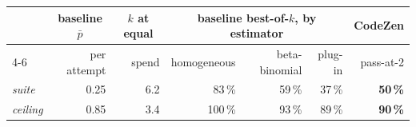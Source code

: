 
\begin{tabular}{@{}lrrrrrr@{}}
\toprule
 & \multicolumn{1}{c}{baseline $\bar p$} & \multicolumn{1}{c}{$k$ at equal} &
 \multicolumn{3}{c}{baseline best-of-$k$, by estimator} & \multicolumn{1}{c}{CodeZen} \\
\cmidrule(lr){4-6}
 & per attempt & spend & homogeneous & beta-binomial & plug-in & pass-at-2 \\
\midrule
\emph{suite} & 0.25 & 6.2 & 83\,\% & 59\,\% & 37\,\% & \textbf{50\,\%} \\
\emph{ceiling} & 0.85 & 3.4 & 100\,\% & 93\,\% & 89\,\% & \textbf{90\,\%} \\
\bottomrule
\end{tabular}
